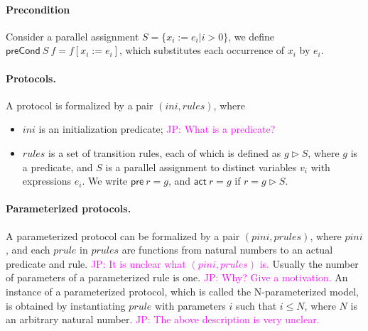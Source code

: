 \documentclass{llncs}
\newcommand\JP[1]{\textcolor{magenta}{JP: #1}}
\begin{document}
\paragraph*{Precondition} Consider a parallel assignment $S=\{x_i:=e_i | i>0\}$,
we define $\mathsf{preCond}~S~f=f[x_i:=e_i]$, which substitutes each
occurrence of $x_i$ by $e_i$.


\paragraph*{Protocols.} A protocol is formalized by a pair
$(ini,rules)$, where
%
\begin{itemize}
\item $ini $ is an initialization predicate; \JP{What is a predicate?}

\item $rules$ is a set of transition rules, each of which is defined as
  $g \vartriangleright  S$, where $g$ is a predicate, and $S$ is a
  parallel assignment to distinct  variables $v_i$ with expressions
  $e_i$. We write $\mathsf{pre}~r=g$, and $\mathsf{act}~r=g$ if $r=g \vartriangleright
  S$.
\end{itemize}

\paragraph*{Parameterized protocols.}
A parameterized protocol can be formalized by a pair
$(pini,prules)$, where $pini$, and each $prule$ in $prules$ are
functions from natural numbers to an actual predicate and  rule.
\JP{It is unclear what $(pini,prules)$ is.}
Usually the number of parameters of a parameterized rule is one.
\JP{Why? Give a motivation.}
An instance of a parameterized protocol, which is called the
N-parameterized model, is obtained by instantiating $prule$ with
parameters $i$ such that $i \le N$, where $N$ is an arbitrary
natural number. %
\JP{The above description is very unclear.}
\end{document}
